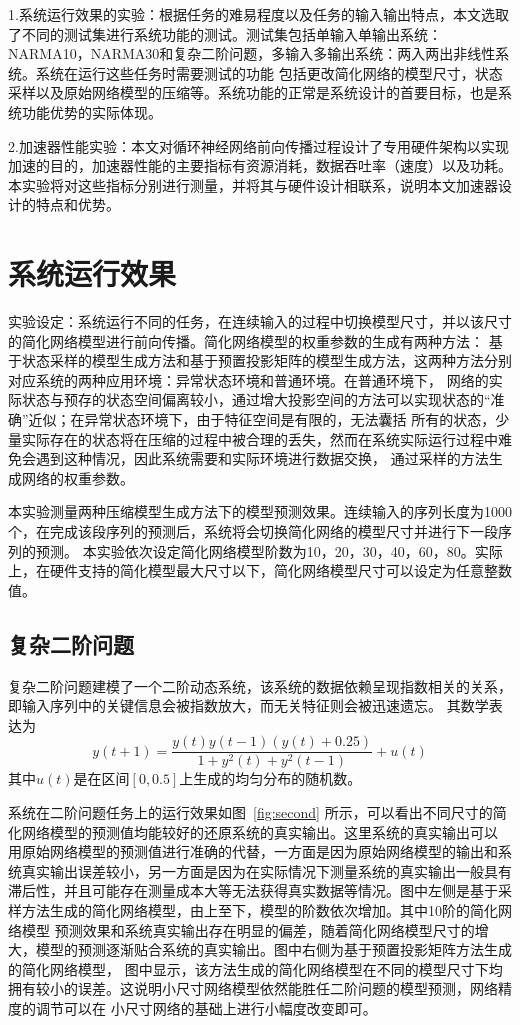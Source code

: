 1.系统运行效果的实验：根据任务的难易程度以及任务的输入输出特点，本文选取了不同的测试集进行系统功能的测试。测试集包括单输入单输出系统：
NARMA10，NARMA30和复杂二阶问题，多输入多输出系统：两入两出非线性系统。系统在运行这些任务时需要测试的功能
包括更改简化网络的模型尺寸，状态采样以及原始网络模型的压缩等。系统功能的正常是系统设计的首要目标，也是系统功能优势的实际体现。

2.加速器性能实验：本文对循环神经网络前向传播过程设计了专用硬件架构以实现加速的目的，加速器性能的主要指标有资源消耗，数据吞吐率（速度）以及功耗。
本实验将对这些指标分别进行测量，并将其与硬件设计相联系，说明本文加速器设计的特点和优势。

\section{系统运行效果}
实验设定：系统运行不同的任务，在连续输入的过程中切换模型尺寸，并以该尺寸的简化网络模型进行前向传播。简化网络模型的权重参数的生成有两种方法：
基于状态采样的模型生成方法和基于预置投影矩阵的模型生成方法，这两种方法分别对应系统的两种应用环境：异常状态环境和普通环境。在普通环境下，
网络的实际状态与预存的状态空间偏离较小，通过增大投影空间的方法可以实现状态的“准确”近似；在异常状态环境下，由于特征空间是有限的，无法囊括
所有的状态，少量实际存在的状态将在压缩的过程中被合理的丢失，然而在系统实际运行过程中难免会遇到这种情况，因此系统需要和实际环境进行数据交换，
通过采样的方法生成网络的权重参数。

本实验测量两种压缩模型生成方法下的模型预测效果。连续输入的序列长度为1000个，在完成该段序列的预测后，系统将会切换简化网络的模型尺寸并进行下一段序列的预测。
本实验依次设定简化网络模型阶数为10，20，30，40，60，80。实际上，在硬件支持的简化模型最大尺寸以下，简化网络模型尺寸可以设定为任意整数值。

\subsection{复杂二阶问题}
复杂二阶问题建模了一个二阶动态系统，该系统的数据依赖呈现指数相关的关系，即输入序列中的关键信息会被指数放大，而无关特征则会被迅速遗忘。
其数学表达为
\begin{equation}
	y(t+1) = \frac{y(t)y(t-1)(y(t)+0.25)}{1+y^2(t)+y^2(t-1)} + u(t)
\end{equation}
其中\(u(t)\)是在区间\([0,0.5]\)上生成的均匀分布的随机数。


系统在二阶问题任务上的运行效果如图~\ref{fig:second} 所示，可以看出不同尺寸的简化网络模型的预测值均能较好的还原系统的真实输出。这里系统的真实输出可以
用原始网络模型的预测值进行准确的代替，一方面是因为原始网络模型的输出和系统真实输出误差较小，另一方面是因为在实际情况下测量系统的真实输出一般具有
滞后性，并且可能存在测量成本大等无法获得真实数据等情况。图中左侧是基于采样方法生成的简化网络模型，由上至下，模型的阶数依次增加。其中10阶的简化网络模型
预测效果和系统真实输出存在明显的偏差，随着简化网络模型尺寸的增大，模型的预测逐渐贴合系统的真实输出。图中右侧为基于预置投影矩阵方法生成的简化网络模型，
图中显示，该方法生成的简化网络模型在不同的模型尺寸下均拥有较小的误差。这说明小尺寸网络模型依然能胜任二阶问题的模型预测，网络精度的调节可以在
小尺寸网络的基础上进行小幅度改变即可。

